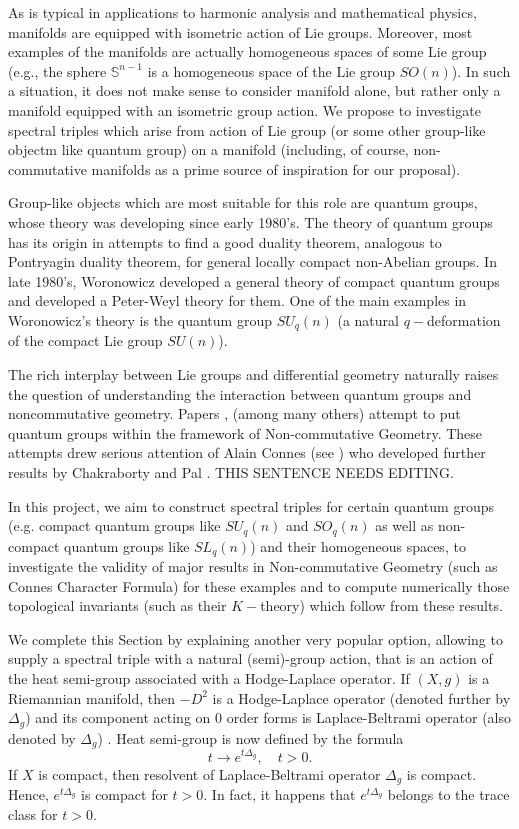 \documentclass{article}
\begin{document}
As is typical in applications to harmonic analysis and mathematical physics, manifolds are equipped with isometric action of Lie groups. Moreover, most examples of the manifolds are actually homogeneous spaces of some Lie group (e.g., the sphere $\mathbb{S}^{n-1}$ is a homogeneous space of the Lie group $SO(n)$). In such a situation, it does not make sense to consider manifold alone, but rather only a manifold equipped with an isometric group action. We propose to investigate spectral triples which arise from action of Lie group (or some other group-like objectm like quantum group) on a manifold (including, of course, non-commutative manifolds as a prime source of inspiration for our proposal).

Group-like objects which are most suitable for this role are quantum groups, whose theory was developing since early 1980's. The theory of quantum groups has its origin in attempts to find a good duality theorem, analogous to Pontryagin duality theorem, for general locally compact non-Abelian groups. In late 1980's, Woronowicz developed a general theory of compact quantum groups and developed a Peter-Weyl theory for them. One of the main examples in Woronowicz's theory is the quantum group $SU_q(n)$ (a natural $q-$deformation of the compact Lie group $SU(n)$). 

The rich interplay between Lie groups and differential geometry naturally raises the question of understanding the interaction between quantum groups and noncommutative geometry. Papers \cite{ChakrabortyPal}, \cite{NeshTus} (among many others) attempt to put quantum groups within the framework of Non-commutative Geometry. These attempts drew serious attention of Alain Connes (see \cite{Connes-suq2}) who developed further results by Chakraborty and Pal \cite{ChakrabortyPal}. {\color{blue} THIS SENTENCE NEEDS EDITING.}

In this project, we aim to construct spectral triples for certain quantum groups (e.g. compact quantum groups like $SU_q(n)$ and $SO_q(n)$ as well as non-compact quantum groups like $SL_q(n)$) and their homogeneous spaces, to investigate the validity of major results in Non-commutative Geometry (such as Connes Character Formula) for these examples and to compute numerically those topological invariants (such as their $K-$theory) which follow from these results.

We complete this Section by explaining another very popular option, allowing to supply a spectral triple with a natural (semi)-group action, that is an action of the heat semi-group associated with a Hodge-Laplace operator. If $(X,g)$ is a Riemannian manifold, then $-D^2$ is a Hodge-Laplace operator (denoted further by $\Delta_g$) and its component acting on $0$ order forms is Laplace-Beltrami operator (also denoted by $\Delta_g$) \cite{Rosenberg}. Heat semi-group is now defined by the formula
$$t\to e^{t\Delta_g},\quad t>0.$$
If $X$ is compact, then resolvent of Laplace-Beltrami operator $\Delta_g$ is compact. Hence, $e^{t\Delta_g}$ is compact for $t>0.$ In fact, it happens that $e^{t\Delta_g}$ belongs to the trace class for $t>0.$
\end{document}
